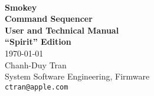 
\begin{titlepage}

\setlength{\parindent}{0in}

{
	\fontsize{32}{32}\selectfont
	\textcolor{AppleGray}{\AppleLogo}
}
\\[0.25in]

{
	\fontsize{32}{32}\selectfont
	\textcolor{SmokeyDarkBlue}{\bfseries Smokey} \\
	\textbf{Command Sequencer} \\
	\textbf{User and Technical Manual}
}
\\[0.25in]

\textbf{``Spirit'' Edition} \\
\today
\\[0.25in]

Chanh-Duy Tran \\
System Software Engineering, Firmware \\
\texttt{ctran@apple.com}

\vfill

\begin{center}
\end{center}

\end{titlepage}
